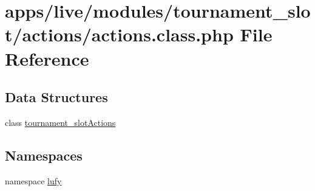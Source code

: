 \hypertarget{live_2modules_2tournament__slot_2actions_2actions_8class_8php}{\section{apps/live/modules/tournament\-\_\-slot/actions/actions.class.\-php File Reference}
\label{live_2modules_2tournament__slot_2actions_2actions_8class_8php}
}
\subsection*{Data Structures}
\begin{DoxyCompactItemize}
\item 
class \hyperlink{classtournament__slot_actions}{tournament\-\_\-slot\-Actions}
\end{DoxyCompactItemize}
\subsection*{Namespaces}
\begin{DoxyCompactItemize}
\item 
namespace \hyperlink{namespacelufy}{lufy}
\end{DoxyCompactItemize}
